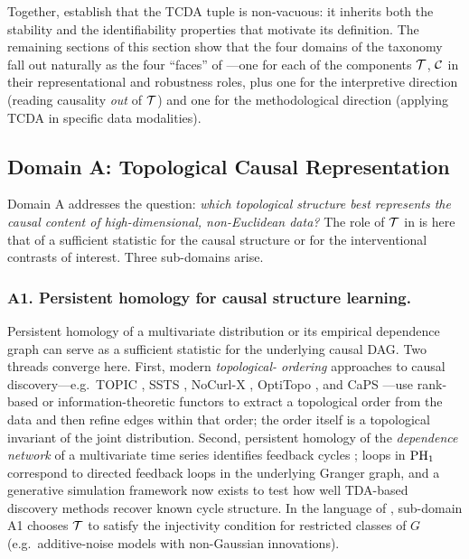 \medskip
Together,  establish
that the TCDA tuple is non-vacuous: it inherits both the stability and
the identifiability properties that motivate its definition. The
remaining sections of this section show that the four domains of the
taxonomy fall out naturally as the four ``faces'' of ---one
for each of the components $\mathcal{T}$, $\mathcal{C}$ in their representational and
robustness roles, plus one for the interpretive direction (reading
causality \emph{out} of $\mathcal{T}$) and one for the methodological direction
(applying TCDA in specific data modalities).

\subsection{Domain A: Topological Causal Representation}\label{sec:domain-A}

Domain A addresses the question: \emph{which topological structure best
represents the causal content of high-dimensional, non-Euclidean data?}
The role of $\mathcal{T}$ in  is here that of a sufficient
statistic for the causal structure or for the interventional contrasts
of interest. Three sub-domains arise.

\subsubsection*{A1. Persistent homology for causal structure learning.}
Persistent homology of a multivariate distribution or its empirical
dependence graph can serve as a sufficient statistic for the underlying
causal DAG. Two threads converge here. First, modern \emph{topological-
ordering} approaches to causal discovery---e.g.\ TOPIC
\citep{tran2024constraining}, SSTS \citep{xu2025information}, NoCurl-X
\citep{nocurl2024}, OptiTopo \citep{wu2026optimization}, and CaPS
\citep{rolland2022score}---use rank-based or information-theoretic
functors to extract a topological order from the data and then refine
edges within that order; the order itself is a topological invariant of
the joint distribution. Second, persistent homology of the
\emph{dependence network} of a multivariate time series identifies
feedback cycles \citep{elyaagoubi2023statistical}; loops in
$\mathrm{PH}_{1}$ correspond to directed feedback loops in the underlying
Granger graph, and a generative simulation framework
\citep{elyaagoubi2023statistical} now exists to test how well
TDA-based discovery methods recover known cycle structure. In the
language of , sub-domain A1 chooses $\mathcal{T}$ to
satisfy the injectivity condition for restricted classes of $G$ (e.g.\
additive-noise models with non-Gaussian innovations).

